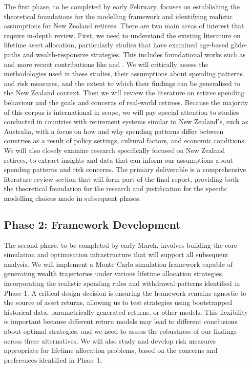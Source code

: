 \documentclass[11pt]{article}
\begin{document}
The first phase, to be completed by early February, focuses on establishing the theoretical foundations for the modelling framework and identifying realistic assumptions for New Zealand retirees. There are two main areas of interest that require in-depth review. First, we need to understand the existing literature on lifetime asset allocation, particularly studies that have examined age-based glide-paths and wealth-responsive strategies. This includes foundational works such as \textcite{merton1969lifetime} and more recent contributions like \textcite{anarkulova2025beyond} and \textcite{Makinen2024}. We will critically assess the methodologies used in these studies, their assumptions about spending patterns and risk measures, and the extent to which their findings can be generalised to the New Zealand context. Then we will review the literature on retiree spending behaviour and the goals and concerns of real-world retirees. Because the majority of this corpus is international in scope, we will pay special attention to studies conducted in countries with retirement systems similar to New Zealand's, such as Australia, with a focus on how and why spending patterns differ between countries as a result of policy settings, cultural factors, and economic conditions. We will also closely examine research specifically focused on New Zealand retirees, to extract insights and data that can inform our assumptions about spending patterns and risk concerns. The primary deliverable is a comprehensive literature review section that will form part of the final report, providing both the theoretical foundation for the research and justification for the specific modelling choices made in subsequent phases.


\subsection{Phase 2: Framework Development}

The second phase, to be completed by early March, involves building the core simulation and optimisation infrastructure that will support all subsequent analysis. We will implement a Monte Carlo simulation framework capable of generating wealth trajectories under various lifetime allocation strategies, incorporating the realistic spending rules and withdrawal patterns identified in Phase 1. A critical design decision is ensuring the framework remains agnostic to the source of asset returns, allowing us to test strategies using bootstrapped historical data, parametrically generated returns, or other models. This flexibility is important because different return models may lead to different conclusions about optimal strategies, and we need to assess the robustness of our findings across these alternatives. We will also study and develop risk measures appropriate for lifetime allocation problems, based on the concerns and preferences identified in Phase 1.
\end{document}
